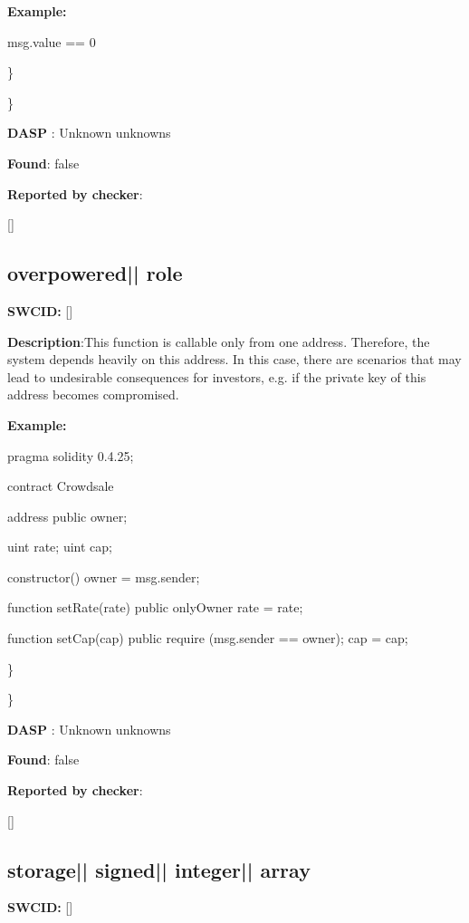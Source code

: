 \documentclass{article}
\begin{document}
\textbf{Example:} 
\begin{ffcode} 

msg.value == 0

\end{ffcode} 
\} 

\} 

\textbf{DASP} : Unknown unknowns

\textbf{Found}: false

\textbf{Reported by checker}: 
\begin{ffcode} 

[]
\end{ffcode} 
\subsection{overpowered{|\textunderscore| }role} 
\textbf{SWC{\textunderscore }ID:} []

\textbf{Description}:This function is callable only from one address. Therefore, the system depends heavily on this address. In this case, there are scenarios that may lead to undesirable consequences for investors, e.g. if the private key of this address becomes compromised.


\textbf{Example:} 
\begin{ffcode} 

pragma solidity 0.4.25;

contract Crowdsale {

    address public owner;

    uint rate;
    uint cap;

    constructor() {
        owner = msg.sender;
    }

    function setRate(\textunderscore rate) public onlyOwner {
        rate = \textunderscore rate;
    }

    function setCap(\textunderscore cap) public {
        require (msg.sender == owner);
        cap = \textunderscore cap;
    }
}

\end{ffcode} 
\} 

\} 

\textbf{DASP} : Unknown unknowns

\textbf{Found}: false

\textbf{Reported by checker}: 
\begin{ffcode} 

[]
\end{ffcode} 
\subsection{storage{|\textunderscore| }signed{|\textunderscore| }integer{|\textunderscore| }array} 
\textbf{SWC{\textunderscore }ID:} []
\end{document}
